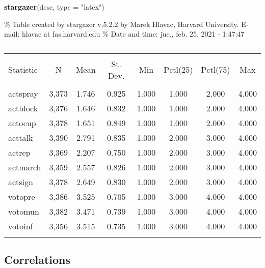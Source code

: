 \documentclass[
]{article}
\newenvironment{Shaded}{\begin{snugshade}}{\end{snugshade}}
\newcommand{\DataTypeTok}[1]{\textcolor[rgb]{0.13,0.29,0.53}{#1}}
\newcommand{\KeywordTok}[1]{\textcolor[rgb]{0.13,0.29,0.53}{\textbf{#1}}}
\newcommand{\NormalTok}[1]{#1}
\newcommand{\StringTok}[1]{\textcolor[rgb]{0.31,0.60,0.02}{#1}}
\begin{document}
\begin{Shaded}
\begin{Highlighting}[]
\KeywordTok{stargazer}\NormalTok{(desc, }\DataTypeTok{type =} \StringTok{"latex"}\NormalTok{)}
\end{Highlighting}
\end{Shaded}

\% Table created by stargazer v.5.2.2 by Marek Hlavac, Harvard
University. E-mail: hlavac at fas.harvard.edu \% Date and time: jue.,
feb. 25, 2021 - 1:47:47

\begin{table}[!htbp] \centering 
  \caption{} 
  \label{} 
\begin{tabular}{@{\extracolsep{5pt}}lccccccc} 
\\[-1.8ex]\hline 
\hline \\[-1.8ex] 
Statistic & \multicolumn{1}{c}{N} & \multicolumn{1}{c}{Mean} & \multicolumn{1}{c}{St. Dev.} & \multicolumn{1}{c}{Min} & \multicolumn{1}{c}{Pctl(25)} & \multicolumn{1}{c}{Pctl(75)} & \multicolumn{1}{c}{Max} \\ 
\hline \\[-1.8ex] 
actspray & 3,373 & 1.746 & 0.925 & 1.000 & 1.000 & 2.000 & 4.000 \\ 
actblock & 3,376 & 1.646 & 0.832 & 1.000 & 1.000 & 2.000 & 4.000 \\ 
actocup & 3,378 & 1.651 & 0.849 & 1.000 & 1.000 & 2.000 & 4.000 \\ 
acttalk & 3,390 & 2.791 & 0.835 & 1.000 & 2.000 & 3.000 & 4.000 \\ 
actrep & 3,369 & 2.207 & 0.750 & 1.000 & 2.000 & 3.000 & 4.000 \\ 
actmarch & 3,359 & 2.557 & 0.826 & 1.000 & 2.000 & 3.000 & 4.000 \\ 
actsign & 3,378 & 2.649 & 0.830 & 1.000 & 2.000 & 3.000 & 4.000 \\ 
votopre & 3,386 & 3.525 & 0.705 & 1.000 & 3.000 & 4.000 & 4.000 \\ 
votomun & 3,382 & 3.471 & 0.739 & 1.000 & 3.000 & 4.000 & 4.000 \\ 
votoinf & 3,356 & 3.515 & 0.735 & 1.000 & 3.000 & 4.000 & 4.000 \\ 
\hline \\[-1.8ex] 
\end{tabular} 
\end{table}

\hypertarget{correlations}{%
\subsection{Correlations}\label{correlations}}
\end{document}

